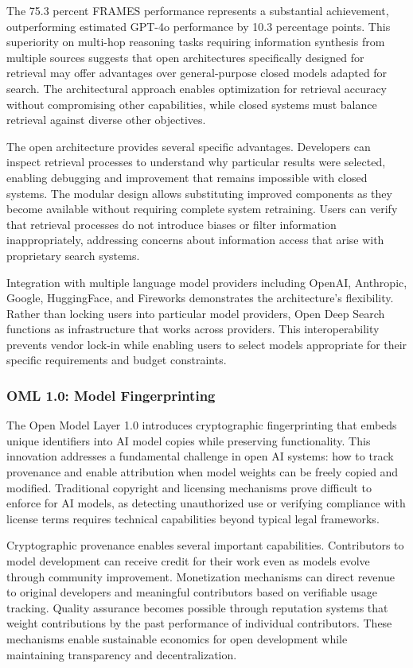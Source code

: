 The 75.3 percent FRAMES performance \cite{ods_github2025} represents a substantial achievement, outperforming estimated GPT-4o performance by 10.3 percentage points. This superiority on multi-hop reasoning tasks requiring information synthesis from multiple sources suggests that open architectures specifically designed for retrieval may offer advantages over general-purpose closed models adapted for search. The architectural approach enables optimization for retrieval accuracy without compromising other capabilities, while closed systems must balance retrieval against diverse other objectives.

The open architecture provides several specific advantages. Developers can inspect retrieval processes to understand why particular results were selected, enabling debugging and improvement that remains impossible with closed systems. The modular design allows substituting improved components as they become available without requiring complete system retraining. Users can verify that retrieval processes do not introduce biases or filter information inappropriately, addressing concerns about information access that arise with proprietary search systems.

Integration with multiple language model providers including OpenAI, Anthropic, Google, HuggingFace, and Fireworks demonstrates the architecture's flexibility. Rather than locking users into particular model providers, Open Deep Search functions as infrastructure that works across providers. This interoperability prevents vendor lock-in while enabling users to select models appropriate for their specific requirements and budget constraints.

\subsubsection{OML 1.0: Model Fingerprinting}

The Open Model Layer 1.0 introduces cryptographic fingerprinting that embeds unique identifiers into AI model copies while preserving functionality. This innovation addresses a fundamental challenge in open AI systems: how to track provenance and enable attribution when model weights can be freely copied and modified. Traditional copyright and licensing mechanisms prove difficult to enforce for AI models, as detecting unauthorized use or verifying compliance with license terms requires technical capabilities beyond typical legal frameworks.

Cryptographic provenance enables several important capabilities. Contributors to model development can receive credit for their work even as models evolve through community improvement. Monetization mechanisms can direct revenue to original developers and meaningful contributors based on verifiable usage tracking. Quality assurance becomes possible through reputation systems that weight contributions by the past performance of individual contributors. These mechanisms enable sustainable economics for open development while maintaining transparency and decentralization.

